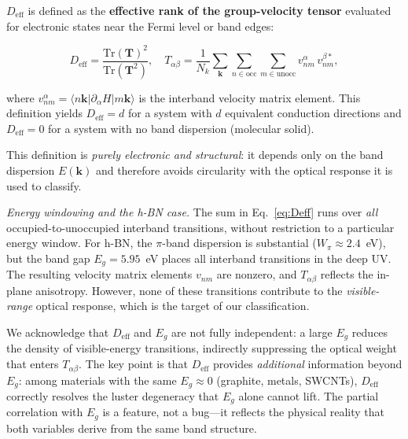 \documentclass[twocolumn,showpacs,preprintnumbers,amsmath,amssymb,prb]{revtex4-2}
\begin{document}
$D_\mathrm{eff}$ is defined as the \textbf{effective rank of the
group-velocity tensor} evaluated for electronic states near the Fermi
level or band edges:

\begin{equation}
  D_\mathrm{eff}
    = \frac{\mathrm{Tr}(\mathbf{T})^2}{\mathrm{Tr}(\mathbf{T}^2)},
  \quad
  T_{\alpha\beta}
    = \frac{1}{N_k} \sum_{\bm{k}} \sum_{n \in \mathrm{occ}} \sum_{m \in \mathrm{unocc}}
    v_{nm}^{\alpha}\, v_{nm}^{\beta *},
  \label{eq:Deff}
\end{equation}

\noindent where $v_{nm}^{\alpha} = \langle n\bm{k} | \partial_\alpha H | m\bm{k} \rangle$
is the interband velocity matrix element. This definition yields
$D_\mathrm{eff} = d$ for a system with $d$ equivalent conduction
directions and $D_\mathrm{eff} = 0$ for a system with no band
dispersion (molecular solid).

This definition is \emph{purely electronic and structural}: it depends
only on the band dispersion $E(\bm{k})$ and therefore avoids
circularity with the optical response it is used to classify.

\emph{Energy windowing and the h-BN case.}
The sum in Eq.~\ref{eq:Deff} runs over \emph{all} occupied-to-unoccupied
interband transitions, without restriction to a particular energy window.
For h-BN, the $\pi$-band dispersion is substantial ($W_\pi \approx
2.4$~eV), but the band gap $E_g = 5.95$~eV places all interband
transitions in the deep UV. The resulting velocity matrix elements
$v_{nm}$ are nonzero, and $T_{\alpha\beta}$ reflects the in-plane
anisotropy. However, none of these transitions contribute to the
\emph{visible-range} optical response, which is the target of our
classification.

We acknowledge that $D_\mathrm{eff}$ and $E_g$ are not fully
independent: a large $E_g$ reduces the density of visible-energy
transitions, indirectly suppressing the optical weight that enters
$T_{\alpha\beta}$. The key point is that $D_\mathrm{eff}$ provides
\emph{additional} information beyond $E_g$: among materials with the
same $E_g \approx 0$ (graphite, metals, SWCNTs), $D_\mathrm{eff}$
correctly resolves the luster degeneracy that $E_g$ alone cannot lift.
The partial correlation with $E_g$ is a feature, not a bug---it
reflects the physical reality that both variables derive from the
same band structure.
\end{document}
